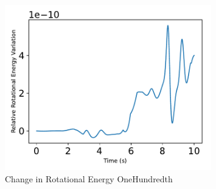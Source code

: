 \begin{figure}[htbp]\centerline{\includegraphics[width=0.8\textwidth]{AutoTeX/ChangeInRotationalEnergyOneHundredth}}\caption{Change in Rotational Energy OneHundredth}\label{fig:ChangeInRotationalEnergyOneHundredth}\end{figure}